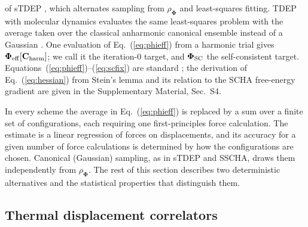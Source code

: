 \documentclass[aip,jap,reprint,amsmath,amssymb,floatfix]{revtex4-2}
\begin{document}
of sTDEP \cite{ref60}, which alternates sampling from
$\rho_{\boldsymbol\Phi}$ and least-squares fitting. TDEP with molecular
dynamics evaluates the same least-squares problem with the average taken over
the classical anharmonic canonical ensemble instead of a Gaussian
\cite{ref5,ref6}. One evaluation of Eq.~(\ref{eq:phieff}) from a harmonic
trial gives $\boldsymbol\Phi_{\rm eff}[\mathbf C_{\rm harm}]$; we call it the
iteration-0 target, and $\boldsymbol\Phi_{\rm SC}$ the self-consistent target.
Equations~(\ref{eq:phieff})--(\ref{eq:scfix}) are standard
\cite{ref5,ref7,ref50,ref60}; the derivation of Eq.~(\ref{eq:hessian}) from
Stein's lemma and its relation to the SCHA free-energy gradient are given in
the Supplementary Material, Sec.~S4.

In every scheme the average in Eq.~(\ref{eq:phieff}) is replaced by a sum over
a finite set of configurations, each requiring one first-principles force
calculation. The estimate is a linear regression of forces on
displacements, and its accuracy for a given number of force calculations is
determined by how the configurations are chosen. Canonical (Gaussian) sampling, as in sTDEP and SSCHA, draws
them independently from $\rho_{\boldsymbol\Phi}$. The rest of this section
describes two deterministic alternatives and the statistical properties that
distinguish them.

\subsection{Thermal displacement correlators}
\end{document}
